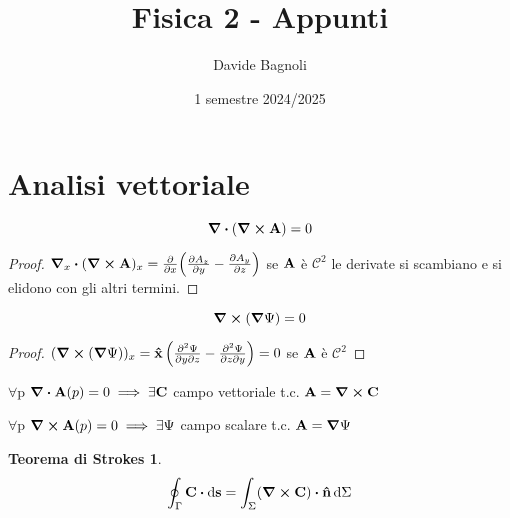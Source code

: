 \documentclass[12pt,a4paper]{article}
\title{Fisica 2 - Appunti}
\author{Davide Bagnoli}
\date{1 semestre 2024/2025}
\begin{document}
\maketitle
\tableofcontents
\newpage

\section{Analisi vettoriale}
\begin{proposition}
    \begin{equation*}
    \div(\curl \vb{A})= 0
    \end{equation*}
\end{proposition}
\begin{proof}
$
\grad_{x}\vdot(\curl{\vb{A}})_{x}=\pdv{x}(\pdv{A_z}{y}-\pdv{A_y}{z})$
se $\vb{A}$ è $\mathcal{C}^{2}$ le derivate si scambiano e si elidono con gli altri termini.
\end{proof}

\begin{proposition}
    \begin{equation*}
    \curl(\grad \Psi)=0
    \end{equation*}
\end{proposition}

\begin{proof}
 $(\curl(\grad\Psi))_{x} = \vu{x}\left( \pdv{\Psi}{y}{z} -\pdv{\Psi}{z}{y}\right)=0$ se $\vb{A}$ è $\mathcal{C}^{2}$   
\end{proof}

\begin{theorem}
    $\forall$p $\div \vb{A}(p)= 0 \implies \exists\vb{C} $ campo vettoriale t.c. $\vb{A} = \curl \vb{C}$
\end{theorem}

\begin{theorem}
    $\forall$p $\curl \vb{A}(p)= 0 \implies \exists\Psi $ campo scalare t.c. $\vb{A} = \grad \Psi$
\end{theorem}

\newtheorem*{TS}{Teorema di Strokes}
\begin{TS}
    \begin{equation*}
    \oint_{\Gamma}\vb{C}\vdot \dd{\vb{s}}= \int_{\Sigma}(\curl \vb{C})\vdot \vu{n} \dd{\Sigma}
    \end{equation*}
\end{TS}
\end{document}
